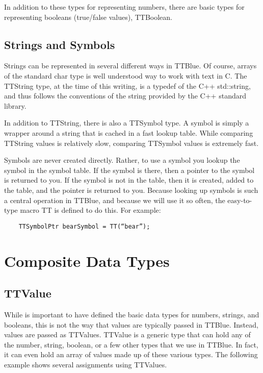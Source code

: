 In addition to these types for representing numbers, there are basic types for representing booleans (true/false values), TTBoolean.


\subsection{Strings and Symbols}

Strings can be represented in several different ways in TTBlue.  Of course, arrays of the standard char type is well understood way to work with text in C.  The TTString type, at the time of this writing, is a typedef of the C++ std::string, and thus follows the conventions of the string provided by the C++ standard library.

In addition to TTString, there is also a TTSymbol type.  A symbol is simply a wrapper around a string that is cached in a fast lookup table.  While comparing TTString values is relatively slow, comparing TTSymbol values is extremely fast.

Symbols are never created directly.  Rather, to use a symbol you lookup the symbol in the symbol table.  If the symbol is there, then a pointer to the symbol is returned to you.  If the symbol is not in the table, then it is created, added to the table, and the pointer is returned to you.  Because looking up symbols is such a central operation in TTBlue, and because we will use it so often, the easy-to-type macro TT is defined to do this.  For example:

\begin{small}\begin{verbatim}
	TTSymbolPtr bearSymbol = TT(“bear”);
\end{verbatim}\end{small}



\section{Composite Data Types}

\subsection{TTValue}

While is important to have defined the basic data types for numbers, strings, and booleans, this is not the way that values are typically passed in TTBlue.  Instead, values are passed as TTValues.  
TTValue is a generic type that can hold any of the number, string, boolean, or a few other types that we use in TTBlue.  In fact, it can even hold an array of values made up of these various types.  The following example shows several assignments using TTValues.

